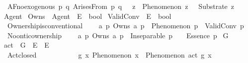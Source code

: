 \begin{isabellebody}
\ \ AF{\isacharunderscore}{\kern0pt}no{\isacharunderscore}{\kern0pt}exogenous{\isacharcolon}{\kern0pt}\ {\isachardoublequoteopen}{\isasymforall}p\ q{\isachardot}{\kern0pt}\ ArisesFrom\ p\ q\ {\isasymlongrightarrow}\ {\isasymnot}\ {\isacharparenleft}{\kern0pt}{\isasymexists}z{\isachardot}{\kern0pt}\ {\isasymnot}\ Phenomenon\ z\ {\isasymand}\ {\isasymnot}\ Substrate\ z{\isacharparenright}{\kern0pt}{\isachardoublequoteclose}%
\isadelimdocument
%
\endisadelimdocument
%
\isatagdocument
%
\isamarkuptrue%
%
\endisatagdocument
{\isafolddocument}%
%
\isadelimdocument
%
\endisadelimdocument
{}\isamarkupfalse%
\ Agent\isanewline
{}\isamarkupfalse%
\ Owns\ {\isacharcolon}{\kern0pt}{\isacharcolon}{\kern0pt}\ {\isachardoublequoteopen}Agent\ {\isasymRightarrow}\ E\ {\isasymRightarrow}\ bool{\isachardoublequoteclose}\isanewline
{}\isamarkupfalse%
\ ValidConv\ {\isacharcolon}{\kern0pt}{\isacharcolon}{\kern0pt}\ {\isachardoublequoteopen}E\ {\isasymRightarrow}\ bool{\isachardoublequoteclose}\isanewline
\isanewline
{}\isamarkupfalse%
\ \isanewline
\ \ Ownership{\isacharunderscore}{\kern0pt}is{\isacharunderscore}{\kern0pt}conventional{\isacharcolon}{\kern0pt}\isanewline
\ \ \ \ {\isachardoublequoteopen}{\isasymforall}a\ p{\isachardot}{\kern0pt}\ Owns\ a\ p\ {\isasymlongrightarrow}\ Phenomenon\ p\ {\isasymand}\ ValidConv\ p{\isachardoublequoteclose}\ \isanewline
\ \ No{\isacharunderscore}{\kern0pt}ontic{\isacharunderscore}{\kern0pt}ownership{\isacharcolon}{\kern0pt}\isanewline
\ \ \ \ {\isachardoublequoteopen}{\isasymforall}a\ p{\isachardot}{\kern0pt}\ Owns\ a\ p\ {\isasymlongrightarrow}\ Inseparable\ p\ {\isasymOmega}\ {\isasymand}\ {\isasymnot}\ Essence\ p{\isachardoublequoteclose}%
\isadelimdocument
%
\endisadelimdocument
%
\isatagdocument
%
\isamarkuptrue%
%
\endisatagdocument
{\isafolddocument}%
%
\isadelimdocument
%
\endisadelimdocument
{}\isamarkupfalse%
\ G\isanewline
{}\isamarkupfalse%
\ act\ {\isacharcolon}{\kern0pt}{\isacharcolon}{\kern0pt}\ {\isachardoublequoteopen}G\ {\isasymRightarrow}\ E\ {\isasymRightarrow}\ E{\isachardoublequoteclose}\ \ \ \isanewline
\isanewline
{}\isamarkupfalse%
\ \isanewline
\ \ Act{\isacharunderscore}{\kern0pt}closed{\isacharcolon}{\kern0pt}\ \ \ \ \ \ \ \ \ \ \ \ {\isachardoublequoteopen}{\isasymforall}g\ x{\isachardot}{\kern0pt}\ Phenomenon\ x\ {\isasymlongrightarrow}\ Phenomenon\ {\isacharparenleft}{\kern0pt}act\ g\ x{\isacharparenright}{\kern0pt}{\isachardoublequoteclose}\ \isanewline

\end{isabellebody}
